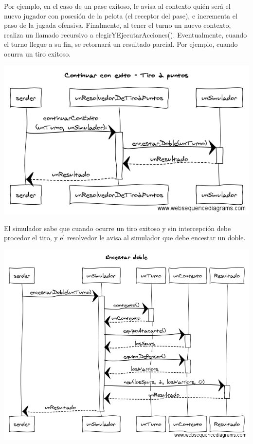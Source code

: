 Por ejemplo, en el caso de un pase exitoso, le avisa al contexto quién será el nuevo jugador con posesión de la pelota (el receptor del pase), e incrementa el paso de la jugada ofensiva. Finalmente, al tener el turno un nuevo contexto, realiza un llamado recursivo a elegirYEjecutarAcciones(). Eventualmente, cuando el turno llegue a su fin, se retornará un resultado parcial. Por ejemplo, cuando ocurra un tiro exitoso.

\begin{center}
\includegraphics[scale=0.45]{diseno/Continuar_con_exito_tiro_2_puntos.png}
\end{center}

El simulador sabe que cuando ocurre un tiro exitoso y sin intercepción debe procedor el tiro, y el resolvedor le avisa al simulador que debe encestar un doble.

\begin{center}
\includegraphics[scale=0.45]{diseno/Encestar_doble.png}
\end{center}

